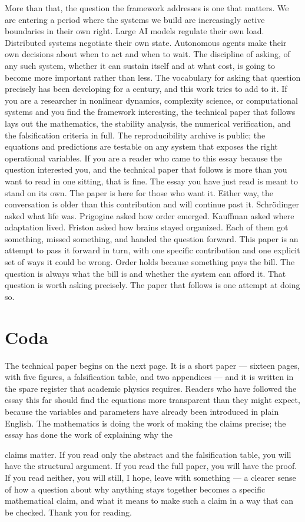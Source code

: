 \documentclass[12pt]{article}
\begin{document}
More than that, the question the framework addresses is one that matters. We are entering a period where the systems we build are increasingly active boundaries in their own right. Large AI models regulate their own load. Distributed systems negotiate their own state. Autonomous agents make their own decisions about when to act and when to wait. The discipline of asking, of any such system, whether it can sustain itself and at what cost, is going to become more important rather than less. The vocabulary for asking that question precisely has been developing for a century, and this work tries to add to it. If you are a researcher in nonlinear dynamics, complexity science, or computational systems and you find the framework interesting, the technical paper that follows lays out the mathematics, the stability analysis, the numerical verification, and the falsification criteria in full. The reproducibility archive is public; the equations and predictions are testable on any system that exposes the right operational variables. If you are a reader who came to this essay because the question interested you, and the technical paper that follows is more than you want to read in one sitting, that is fine. The essay you have just read is meant to stand on its own. The paper is here for those who want it. Either way, the conversation is older than this contribution and will continue past it. Schr{\"o}dinger asked what life was. Prigogine asked how order emerged. Kauffman asked where adaptation lived. Friston asked how brains stayed organized. Each of them got something, missed something, and handed the question forward. This paper is an attempt to pass it forward in turn, with one specific contribution and one explicit set of ways it could be wrong. Order holds because something pays the bill. The question is always what the bill is and whether the system can afford it. That question is worth asking precisely. The paper that follows is one attempt at doing so.


\section*{Coda}

The technical paper begins on the next page. It is a short paper --- sixteen pages, with five figures, a falsification table, and two appendices --- and it is written in the spare register that academic physics requires. Readers who have followed the essay this far should find the equations more transparent than they might expect, because the variables and parameters have already been introduced in plain English. The mathematics is doing the work of making the claims precise; the essay has done the work of explaining why the


claims matter. If you read only the abstract and the falsification table, you will have the structural argument. If you read the full paper, you will have the proof. If you read neither, you will still, I hope, leave with something --- a clearer sense of how a question about why anything stays together becomes a specific mathematical claim, and what it means to make such a claim in a way that can be checked. Thank you for reading.
\end{document}
